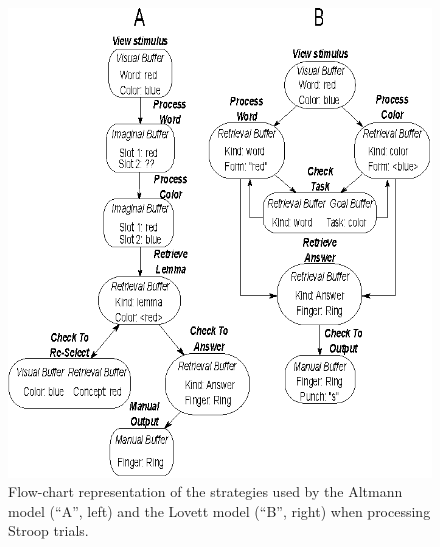\documentclass[10pt,letterpaper]{article}
\begin{document}
\begin{figure}[ht]
\centering
  \includegraphics[width=\linewidth]{both_models.eps}
  \caption{Flow-chart representation of the strategies used by the Altmann model (``A'', left) and the Lovett model (``B'', right) when processing Stroop trials.}
\end{figure}%
\end{document}
